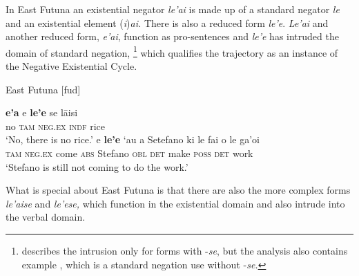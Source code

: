 ﻿\documentclass[output=paper,draft,draftmode,colorlinks,citecolor=brown]{langscibook}
\begin{document}
In East Futuna an existential negator \textit{le'ai} is made up of a
standard negator \textit{le} and an existential element
(\textit{i})\textit{ai.} There is also a reduced form \textit{le'e}.
\textit{Le'ai} and another reduced form, \textit{e'ai}, function as
pro-sentences and \textit{le'e} has intruded the domain of standard
negation,%
%
    \footnote{\textcite[1364]{Veselinova2014} describes the intrusion
    only for forms with -\textit{se}, but the analysis also contains
    example , which is a standard negation use
    without -\textit{se.}} %
%
which qualifies the trajectory as an instance of the
Negative Existential Cycle. 
%
\begin{exe}\ex\label{ex:int-futuna-rice-Stefano}
East Futuna [fud] 
    \begin{xlist}
    \ex\label{ex:int-futuna-rice}
    \gll \textbf{e'a}   e   \textbf{le'e}     se   lāisi \\
    no  \textsc{tam}  \textsc{neg.ex}  \textsc{indf}  rice \\
    \glt `No, there is no rice.'
    \ex\label{ex:int-futuna-Stefano}
    \gll e \textbf{le'e} `au a Setefano ki le fai o le ga'oi\\
      \textsc{tam}  \textsc{neg.ex}  come  \textsc{abs}  Stefano
      \textsc{obl} \textsc{det}   make    \textsc{poss}
      \textsc{det} work \\
    \glt `Stefano is still not coming to do the work.'
    \end{xlist}\end{exe}
%
What is special about East Futuna is that there are also the more complex
forms \textit{le'aise} and \textit{le'ese,} which function in the
existential domain and also intrude into the verbal domain. 
%
\end{document}
